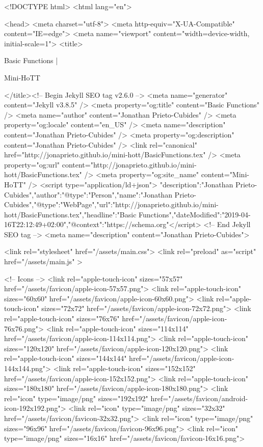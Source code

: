 <!DOCTYPE html>
<html lang="en">

<head>
  <meta charset="utf-8">
  <meta http-equiv="X-UA-Compatible" content="IE=edge">
  <meta name="viewport" content="width=device-width, initial-scale=1">
  <title>
    
      
        Basic Functions |
      
        Mini-HoTT
    
  </title><!-- Begin Jekyll SEO tag v2.6.0 -->
<meta name="generator" content="Jekyll v3.8.5" />
<meta property="og:title" content="Basic Functions" />
<meta name="author" content="Jonathan Prieto-Cubides" />
<meta property="og:locale" content="en_US" />
<meta name="description" content="Jonathan Prieto-Cubides" />
<meta property="og:description" content="Jonathan Prieto-Cubides" />
<link rel="canonical" href="http://jonaprieto.github.io/mini-hott/BasicFunctions.tex" />
<meta property="og:url" content="http://jonaprieto.github.io/mini-hott/BasicFunctions.tex" />
<meta property="og:site_name" content="Mini-HoTT" />
<script type="application/ld+json">
{"description":"Jonathan Prieto-Cubides","author":{"@type":"Person","name":"Jonathan Prieto-Cubides"},"@type":"WebPage","url":"http://jonaprieto.github.io/mini-hott/BasicFunctions.tex","headline":"Basic Functions","dateModified":"2019-04-16T22:12:49+02:00","@context":"https://schema.org"}</script>
<!-- End Jekyll SEO tag -->
<meta name="description" content="Jonathan Prieto-Cubides">

  <link rel="stylesheet" href="/assets/main.css">
  <link rel="preload" as="script" href="/assets/main.js" >

  <!-- Icons -->
  <link rel="apple-touch-icon" sizes="57x57" href="/assets/favicon/apple-icon-57x57.png">
  <link rel="apple-touch-icon" sizes="60x60" href="/assets/favicon/apple-icon-60x60.png">
  <link rel="apple-touch-icon" sizes="72x72" href="/assets/favicon/apple-icon-72x72.png">
  <link rel="apple-touch-icon" sizes="76x76" href="/assets/favicon/apple-icon-76x76.png">
  <link rel="apple-touch-icon" sizes="114x114" href="/assets/favicon/apple-icon-114x114.png">
  <link rel="apple-touch-icon" sizes="120x120" href="/assets/favicon/apple-icon-120x120.png">
  <link rel="apple-touch-icon" sizes="144x144" href="/assets/favicon/apple-icon-144x144.png">
  <link rel="apple-touch-icon" sizes="152x152" href="/assets/favicon/apple-icon-152x152.png">
  <link rel="apple-touch-icon" sizes="180x180" href="/assets/favicon/apple-icon-180x180.png">
  <link rel="icon" type="image/png" sizes="192x192"  href="/assets/favicon/android-icon-192x192.png">
  <link rel="icon" type="image/png" sizes="32x32" href="/assets/favicon/favicon-32x32.png">
  <link rel="icon" type="image/png" sizes="96x96" href="/assets/favicon/favicon-96x96.png">
  <link rel="icon" type="image/png" sizes="16x16" href="/assets/favicon/favicon-16x16.png">

